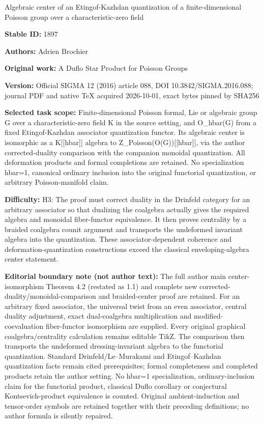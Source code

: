 \documentclass[11pt]{article}
\numberwithin{equation}{section}
\theoremstyle{definition}
\begin{document}
\begin{center}\Large Algebraic center of an Etingof-Kazhdan quantization of a finite-dimensional Poisson group over a characteristic-zero field\end{center}
\noindent\textbf{Stable ID:} 1897\par
\noindent\textbf{Authors:} Adrien Brochier\par
\noindent\textbf{Original work:} A Duflo Star Product for Poisson Groups\par
\noindent\textbf{Version:} Official SIGMA 12 (2016) article 088, DOI 10.3842/SIGMA.2016.088; journal PDF and native TeX acquired 2026-10-01, exact bytes pinned by SHA256\par
\noindent\textbf{Selected task scope:} Finite-dimensional Poisson formal, Lie or algebraic group G over a characteristic-zero field K in the source setting, and O\_hbar(G) from a fixed Etingof-Kazhdan associator quantization functor. Its algebraic center is isomorphic as a K[[hbar]] algebra to Z\_Poisson(O(G))[[hbar]], via the author corrected-duality comparison with the companion monoidal quantization. All deformation products and formal completions are retained. No specialization hbar=\allowbreak{}1, canonical ordinary inclusion into the original functorial quantization, or arbitrary Poisson-manifold claim.\par
\noindent\textbf{Difficulty:} H3: The proof must correct duality in the Drinfeld category for an arbitrary associator so that dualizing the coalgebra actually gives the required algebra and monoidal fiber-functor equivalence. It then proves centrality by a braided coalgebra counit argument and transports the undeformed invariant algebra into the quantization. These associator-dependent coherence and deformation-quantization constructions exceed the classical enveloping-algebra center statement.\par
\noindent\textbf{Editorial boundary note (not author text):} The full author main center-isomorphism Theorem 4.2 (restated as 1.1) and complete new corrected-duality/monoidal-comparison and braided-center proof are retained. For an arbitrary fixed associator, the universal twist from an even associator, central duality adjustment, exact dual-coalgebra multiplication and modified-coevaluation fiber-functor isomorphism are supplied. Every original graphical coalgebra/centrality calculation remains editable TikZ. The comparison then transports the undeformed dressing-invariant algebra to the functorial quantization. Standard Drinfeld/Le–Murakami and Etingof–Kazhdan quantization facts remain cited prerequisites; formal completeness and completed products retain the author setting. No hbar=\allowbreak{}1 specialization, ordinary-inclusion claim for the functorial product, classical Duflo corollary or conjectural Kontsevich-product equivalence is counted. Original ambient-induction and tensor-order symbols are retained together with their preceding definitions; no author formula is silently repaired.\par
\end{document}
